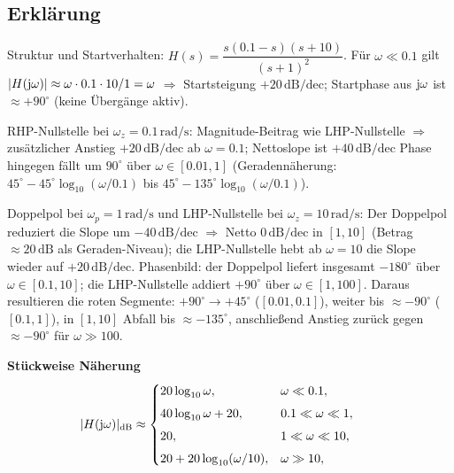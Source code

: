 \subsection{Erklärung}
\vspace{5mm}
\begin{description}[leftmargin=1.2em,labelsep=.6em,font=\bfseries]
\item[Schritt 1] Struktur und Startverhalten: $H(s)=\dfrac{s(0.1-s)(s+10)}{(s+1)^2}$. Für $\omega\ll0.1$ gilt $|H(\operatorname{j}\!\omega)|\approx \omega\cdot 0.1\cdot 10/1=\omega$ $\Rightarrow$ Startsteigung $+20\,\mathrm{dB/dec}$; Startphase aus $\operatorname{j}\!\omega$ ist $\approx+90^\circ$ (keine Übergänge aktiv).
\item[Schritt 2] RHP-Nullstelle bei $\omega_z=0.1\,\mathrm{rad/s}$: Magnitude-Beitrag wie LHP-Nullstelle $\Rightarrow$ zusätzlicher Anstieg $+20\,\mathrm{dB/dec}$ ab $\omega=0.1$; Nettoslope ist $+40\,\mathrm{dB/dec}$  Phase hingegen fällt um $90^\circ$ über $\omega\in[0.01,1]$ (Geradennäherung: $45^\circ-45^\circ\log_{10}(\omega/0.1)$ bis $45^\circ-135^\circ\log_{10}(\omega/0.1)$).
\item[Schritt 3] Doppelpol bei $\omega_p=1\,\mathrm{rad/s}$ und LHP-Nullstelle bei $\omega_z=10\,\mathrm{rad/s}$: Der Doppelpol reduziert die Slope um $-40\,\mathrm{dB/dec}$ $\Rightarrow$ Netto $0\,\mathrm{dB/dec}$ in $[1,10]$ (Betrag $\approx20\,\mathrm{dB}$ als Geraden-Niveau); die LHP-Nullstelle hebt ab $\omega=10$ die Slope wieder auf $+20\,\mathrm{dB/dec}$. Phasenbild: der Doppelpol liefert insgesamt $-180^\circ$ über $\omega\in[0.1,10]$; die LHP-Nullstelle addiert $+90^\circ$ über $\omega\in[1,100]$. Daraus resultieren die roten Segmente: $+90^\circ\to+45^\circ$ ($[0.01,0.1]$), weiter bis $\approx-90^\circ$ ($[0.1,1]$), in $[1,10]$ Abfall bis $\approx-135^\circ$, anschließend Anstieg zurück gegen $\approx-90^\circ$ für $\omega\gg100$.
\end{description}

\vspace{0.5cm}
\medskip
\noindent\textbf{Stückweise Näherung}
\[
|H(\operatorname{j}\!\omega)|_{\mathrm{dB}}\approx
\begin{cases}
20\log_{10}\omega,& \omega\ll0.1,\\[4pt]
40\log_{10}\omega+20,& 0.1\ll\omega\ll1,\\[4pt]
20,& 1\ll\omega\ll10,\\[4pt]
20+20\log_{10}(\omega/10),& \omega\gg10,
\end{cases}
\qquad
\]
\newpage